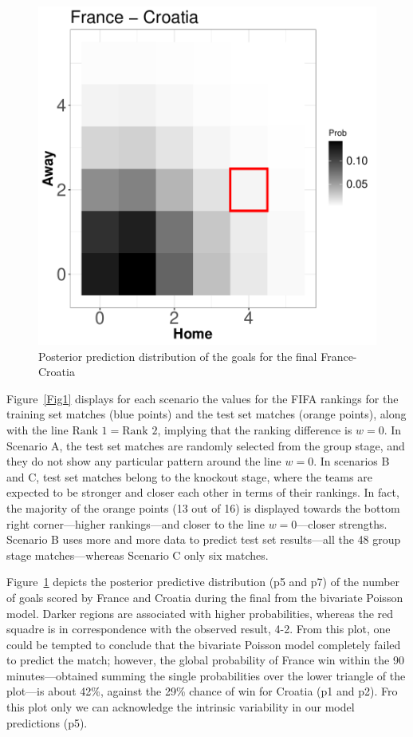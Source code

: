 \documentclass{statsoc}
\begin{document}
%
\begin{figure}
\centering
\includegraphics[scale=0.5]{France-CroatiaHeatmap_bivpois}
\caption{Posterior prediction distribution of the goals for the final France-Croatia}
\label{Fig2}
\end{figure}
%
Figure~\ref{Fig1} displays for each scenario the values for the FIFA rankings for the training set matches (blue points) and the test set matches (orange points), along with the 
line $\text{Rank }1= \text{Rank }2$, implying that the ranking difference is $w=0$. In Scenario A, the test set matches are randomly selected from the group stage, and they do not 
show any particular pattern around the line $w=0$. In scenarios B and C, test set matches belong to the knockout stage, where the teams are expected to be stronger and 
closer each other in terms of their rankings. In fact, the majority of the orange points (13 out of 16) is displayed towards the bottom right corner---higher rankings---and closer to the line $w=0$---closer strengths. Scenario B uses more and more data to predict test set results---all the 48 group stage matches---whereas Scenario C only six matches.

Figure~\ref{Fig2} depicts the posterior predictive distribution (p5 and p7) of the number of goals scored by France and Croatia during the final from the bivariate Poisson model. Darker 
regions are associated with higher probabilities, whereas the red squadre is in correspondence with the observed result, 4-2. From this plot, one could be tempted to 
conclude that the bivariate Poisson model completely failed to predict the match; however, the global probability of France win within the 90 minutes---obtained summing the single probabilities over the lower triangle of the plot---is about 42\%, against the 29\% chance of win for Croatia (p1 and p2). Fro this plot only we can acknowledge the intrinsic variability in our model predictions (p5).
\end{document}
